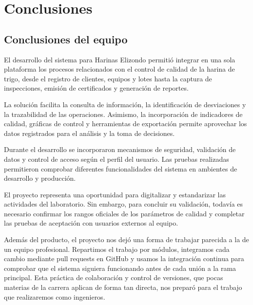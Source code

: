 \FloatBarrier
\section{Conclusiones}\label{sec:conclusiones}

\subsection{Conclusiones del equipo}\label{sec:conclusiones-equipo}

El desarrollo del sistema para Harinas Elizondo permitió integrar en una sola plataforma los procesos relacionados con el control de calidad de la harina de trigo, desde el registro de clientes, equipos y lotes hasta la captura de inspecciones, emisión de certificados y generación de reportes.

La solución facilita la consulta de información, la identificación de desviaciones y la trazabilidad de las operaciones. Asimismo, la incorporación de indicadores de calidad, gráficas de control y herramientas de exportación permite aprovechar los datos registrados para el análisis y la toma de decisiones.

Durante el desarrollo se incorporaron mecanismos de seguridad, validación de datos y control de acceso según el perfil del usuario. Las pruebas realizadas permitieron comprobar diferentes funcionalidades del sistema en ambientes de desarrollo y producción.

El proyecto representa una oportunidad para digitalizar y estandarizar las actividades del laboratorio. Sin embargo, para concluir su validación, todavía es necesario confirmar los rangos oficiales de los parámetros de calidad y completar las pruebas de aceptación con usuarios externos al equipo.

Además del producto, el proyecto nos dejó una forma de trabajar parecida a la de un equipo profesional. Repartimos el trabajo por módulos, integramos cada cambio mediante pull requests en GitHub y usamos la integración continua para comprobar que el sistema siguiera funcionando antes de cada unión a la rama principal. Esta práctica de colaboración y control de versiones, que pocas materias de la carrera aplican de forma tan directa, nos preparó para el trabajo que realizaremos como ingenieros.


